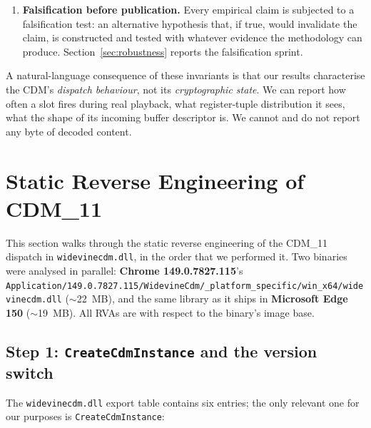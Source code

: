 \documentclass[11pt,letterpaper]{article}
\begin{document}
\begin{enumerate}[itemsep=2pt,topsep=2pt]
        operator's own browser session to a commercial streaming
        service to confirm what the CDM does during steady state,
        but we never instrument the decoder, the kernel-side PMP
        component (\texttt{peauth.sys}), the protected surface, or
        any other component positioned to materialise a decrypted
        frame. The shape-only shim is the deepest hook in the
        stack we install.
  \item \textbf{Falsification before publication.} Every empirical
        claim is subjected to a falsification test: an alternative
        hypothesis that, if true, would invalidate the claim, is
        constructed and tested with whatever evidence the methodology
        can produce. Section~\ref{sec:robustness} reports the
        falsification sprint.
\end{enumerate}

A natural-language consequence of these invariants is that our
results characterise the CDM's \emph{dispatch behaviour}, not its
\emph{cryptographic state}. We can report how often a slot fires
during real playback, what register-tuple distribution it sees,
what the shape of its incoming buffer descriptor is. We cannot
and do not report any byte of decoded content.

\section{Static Reverse Engineering of CDM\_11}
\label{sec:static}

This section walks through the static reverse engineering of the
CDM\_11 dispatch in \texttt{widevinecdm.dll}, in the order that we
performed it. Two binaries were analysed in parallel: \textbf{Chrome
149.0.7827.115}'s
\texttt{Application/149.0.7827.115/WidevineCdm/\_platform\_specific/win\_x64/widevinecdm.dll}
($\sim$22~MB), and the same library as it ships in \textbf{Microsoft
Edge 150} ($\sim$19~MB). All RVAs are with respect to the binary's
image base.

\subsection{Step 1: \texttt{CreateCdmInstance} and the version
            switch}
\label{sec:static-export}

The \texttt{widevinecdm.dll} export table contains six entries; the
only relevant one for our purposes is \texttt{CreateCdmInstance}:
\end{document}
